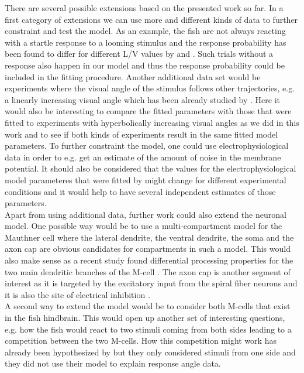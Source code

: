     There are several possible extensions based on the presented work so far.
    In a first category of extensions we can use more and different kinds of data to further constraint and test the model.
    As an example, the fish are not always reacting with a startle response to a looming stimulus and the response probability has been found to differ for different L/V values by \cite{Bhattacharyya2017} and \cite{Temizer2015}.
    Such trials without a response also happen in our model and thus the response probability could be included in the fitting procedure.
    Another additional data set would be experiments where the visual angle of the stimulus follows other trajectories, e.g. a linearly increasing visual angle which has been already studied by \cite{Dunn2016}.
    Here it would also be interesting to compare the fitted parameters with those that were fitted to experiments with hyperbolically increasing visual angles as we did in this work and to see if both kinds of experiments result in the same fitted model parameters.
    To further constraint the model, one could use electrophysiological data in order to e.g. get an estimate of the amount of noise in the membrane potential.
    It should also be considered that the values for the electrophysiological model parameteres that were fitted by \cite{Koyama2016} might change for different experimental conditions and it would help to have several independent estimates of those parameters.\\
    Apart from using additional data, further work could also extend the neuronal model.
    One possible way would be to use a multi-compartment model for the Mauthner cell where the lateral dendrite, the ventral dendrite, the soma and the axon cap are obvious candidates for compartments in such a model.
    This would also make sense as a recent study found differential processing properties for the two main dendritic branches of the M-cell \citep{Medan2017}.
    The axon cap is another segment of interest as it is targeted by the excitatory input from the spiral fiber neurons \citep{Lacoste2015} and it is also the site of electrical inhibition \citep{Weiss2008}.\\
    A second way to extend the model would be to consider both M-cells that exist in the fish hindbrain.
    This would open up another set of interesting questions, e.g. how the fish would react to two stimuli coming from both sides leading to a competition between the two M-cells.
    How this competition might work has already been hypothesized by \cite{Koyama2016} but they only considered stimuli from one side and they did not use their model to explain response angle data.\\
